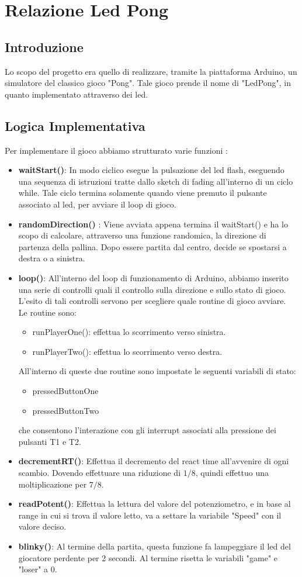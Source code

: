 \documentclass[a4paper]{article}
\begin{document}
\section*{Relazione Led Pong} 
\subsection*{Introduzione}
Lo scopo del progetto era quello di realizzare, tramite la piattaforma Arduino, un simulatore del classico gioco "Pong". Tale gioco prende il nome di "LedPong", in quanto implementato attraverso dei led.
\subsection*{Logica Implementativa}
Per implementare il gioco abbiamo strutturato varie funzioni :
\begin{itemize}
\item \textbf{waitStart()}: In modo ciclico esegue la pulsazione del led flash, eseguendo una sequenza di istruzioni tratte dallo sketch di fading all'interno di un ciclo while. Tale ciclo termina solamente quando viene premuto il pulsante associato al led, per avviare il loop di gioco.
\item \textbf{randomDirection()} : Viene avviata appena termina il waitStart() e ha lo scopo di calcolare, attraverso una funzione randomica, la direzione di partenza della pallina. Dopo essere partita dal centro, decide se spostarsi a destra o a sinistra.
 \item \textbf{loop()}: All'interno del loop di funzionamento di Arduino, abbiamo inserito una serie di controlli quali il controllo sulla direzione e sullo stato di gioco. L'esito di tali controlli servono per scegliere quale routine di gioco avviare. \\Le routine sono: 
\begin{itemize}
\item runPlayerOne(): effettua lo scorrimento verso sinistra.
\item runPlayerTwo(): effettua lo scorrimento verso destra.
\end{itemize}
All'interno di queste due routine sono impostate le seguenti variabili di stato:
\begin{itemize}
\item pressedButtonOne
\item pressedButtonTwo
\end{itemize}
che consentono l'interazione con gli interrupt associati alla pressione dei pulsanti T1 e T2.
\item \textbf{decrementRT()}: Effettua il decremento del react time all'avvenire di ogni scambio. Dovendo effettuare una riduzione di  $1/8$, quindi effettuo una moltiplicazione per $7/8$.
\item \textbf{readPotent()}: Effettua la lettura del valore del potenziometro, e in base al range in cui si trova il valore letto, va a settare la variabile "Speed" con il valore deciso.
\item \textbf{blinky()}: Al termine della partita, questa funzione fa lampeggiare il led del giocatore perdente per 2 secondi. Al termine risetta le variabili "game" e "loser" a 0.
\end{itemize}
\end{document}
